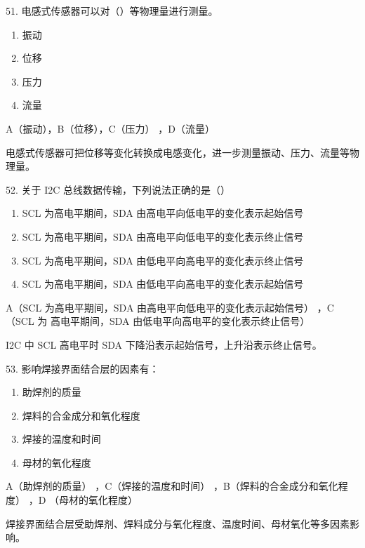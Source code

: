 \begin{question}{51. 电感式传感器可以对（）等物理量进行测量。}
\begin{enumerate}[label=\Alph*., leftmargin=2.4em, itemsep=0.2em]
\item 振动
\item 位移
\item 压力
\item 流量
\end{enumerate}
\end{question}
\begin{answer}
A（振动），B（位移），C（压力） ，D（流量）
\end{answer}
\begin{explanation}
电感式传感器可把位移等变化转换成电感变化，进一步测量振动、压力、流量等物理量。
\end{explanation}

\begin{question}{52. 关于 I2C 总线数据传输，下列说法正确的是（）}
\begin{enumerate}[label=\Alph*., leftmargin=2.4em, itemsep=0.2em]
\item SCL 为高电平期间，SDA 由高电平向低电平的变化表示起始信号
\item SCL 为高电平期间，SDA 由高电平向低电平的变化表示终止信号
\item SCL 为高电平期间，SDA 由低电平向高电平的变化表示终止信号
\item SCL 为高电平期间，SDA 由低电平向高电平的变化表示起始信号
\end{enumerate}
\end{question}
\begin{answer}
A（SCL 为高电平期间，SDA 由高电平向低电平的变化表示起始信号） ，C（SCL 为 高电平期间，SDA 由低电平向高电平的变化表示终止信号）
\end{answer}
\begin{explanation}
I2C 中 SCL 高电平时 SDA 下降沿表示起始信号，上升沿表示终止信号。
\end{explanation}

\begin{question}{53. 影响焊接界面结合层的因素有：}
\begin{enumerate}[label=\Alph*., leftmargin=2.4em, itemsep=0.2em]
\item 助焊剂的质量
\item 焊料的合金成分和氧化程度
\item 焊接的温度和时间
\item 母材的氧化程度
\end{enumerate}
\end{question}
\begin{answer}
A（助焊剂的质量） ，C（焊接的温度和时间） ，B（焊料的合金成分和氧化程度） ，D （母材的氧化程度）
\end{answer}
\begin{explanation}
焊接界面结合层受助焊剂、焊料成分与氧化程度、温度时间、母材氧化等多因素影响。
\end{explanation}

